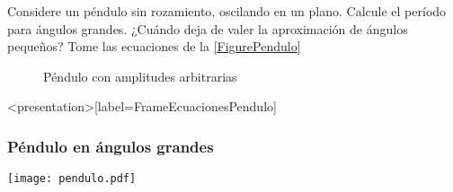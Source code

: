 
Considere un péndulo sin rozamiento, oscilando en un plano. Calcule el período para ángulos
grandes. ¿Cuándo deja de valer la aproximación de ángulos pequeños? Tome las 
ecuaciones de la \autoref{FigurePendulo}

\begin{figure}[h]
  \caption{\protect\label{FigurePendulo}   Péndulo con amplitudes arbitrarias   }
\end{figure}

\mode*

\begin{frame}<presentation>[label=FrameEcuacionesPendulo]
  \frametitle{Péndulo en ángulos grandes}
  \center
  \begin{minipage}{6cm}
      
  \end{minipage}
  \begin{minipage}{6cm}
      \texttt{[image: pendulo.pdf]}
  \end{minipage}
\end{frame}

